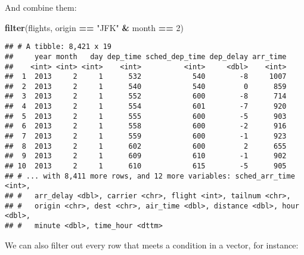 \documentclass[]{book}
\newenvironment{Shaded}{\begin{snugshade}}{\end{snugshade}}
\newcommand{\DecValTok}[1]{\textcolor[rgb]{0.00,0.00,0.81}{#1}}
\newcommand{\KeywordTok}[1]{\textcolor[rgb]{0.13,0.29,0.53}{\textbf{#1}}}
\newcommand{\NormalTok}[1]{#1}
\newcommand{\OperatorTok}[1]{\textcolor[rgb]{0.81,0.36,0.00}{\textbf{#1}}}
\newcommand{\StringTok}[1]{\textcolor[rgb]{0.31,0.60,0.02}{#1}}
\begin{document}
And combine them:

\begin{Shaded}
\begin{Highlighting}[]
\KeywordTok{filter}\NormalTok{(flights, origin }\OperatorTok{==}\StringTok{ "JFK"} \OperatorTok{&}\StringTok{ }\NormalTok{month }\OperatorTok{==}\StringTok{ }\DecValTok{2}\NormalTok{)}
\end{Highlighting}
\end{Shaded}

\begin{verbatim}
## # A tibble: 8,421 x 19
##     year month   day dep_time sched_dep_time dep_delay arr_time
##    <int> <int> <int>    <int>          <int>     <dbl>    <int>
##  1  2013     2     1      532            540        -8     1007
##  2  2013     2     1      540            540         0      859
##  3  2013     2     1      552            600        -8      714
##  4  2013     2     1      554            601        -7      920
##  5  2013     2     1      555            600        -5      903
##  6  2013     2     1      558            600        -2      916
##  7  2013     2     1      559            600        -1      923
##  8  2013     2     1      602            600         2      655
##  9  2013     2     1      609            610        -1      902
## 10  2013     2     1      610            615        -5      905
## # ... with 8,411 more rows, and 12 more variables: sched_arr_time <int>,
## #   arr_delay <dbl>, carrier <chr>, flight <int>, tailnum <chr>,
## #   origin <chr>, dest <chr>, air_time <dbl>, distance <dbl>, hour <dbl>,
## #   minute <dbl>, time_hour <dttm>
\end{verbatim}

We can also filter out every row that meets a condition in a vector, for instance:

\begin{Shaded}
\end{Shaded}
\end{document}
